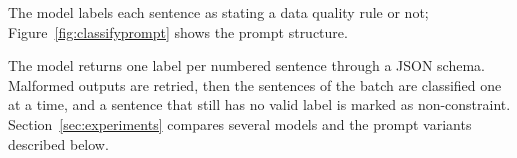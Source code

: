The model labels each sentence as stating a data quality rule or not; Figure~\ref{fig:classifyprompt} shows the prompt structure. 

The model returns one label per numbered sentence through a JSON schema. Malformed outputs are retried, then the sentences of the batch are classified one at a time, and a sentence that still has no valid label is marked as non-constraint. Section~\ref{sec:experiments} compares several models and the prompt variants described below.


